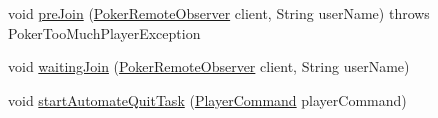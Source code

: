 \begin{DoxyCompactItemize}
\item 
void \hyperlink{classhu_1_1elte_1_1bfw1p6_1_1poker_1_1server_1_1_abstract_poker_table_server_a8e9fcccdc9a25a90fe0cc9a91c289772}{pre\+Join} (\hyperlink{interfacehu_1_1elte_1_1bfw1p6_1_1poker_1_1client_1_1observer_1_1_poker_remote_observer}{Poker\+Remote\+Observer} client, String user\+Name)  throws Poker\+Too\+Much\+Player\+Exception 
\item 
void \hyperlink{classhu_1_1elte_1_1bfw1p6_1_1poker_1_1server_1_1_abstract_poker_table_server_a11757d16af23bf52efbbca941536d477}{waiting\+Join} (\hyperlink{interfacehu_1_1elte_1_1bfw1p6_1_1poker_1_1client_1_1observer_1_1_poker_remote_observer}{Poker\+Remote\+Observer} client, String user\+Name)
\item 
void \hyperlink{classhu_1_1elte_1_1bfw1p6_1_1poker_1_1server_1_1_abstract_poker_table_server_a266437bef65e5674842a5a545fb6c6b3}{start\+Automate\+Quit\+Task} (\hyperlink{classhu_1_1elte_1_1bfw1p6_1_1poker_1_1command_1_1_player_command}{Player\+Command} player\+Command)
\end{DoxyCompactItemize}
